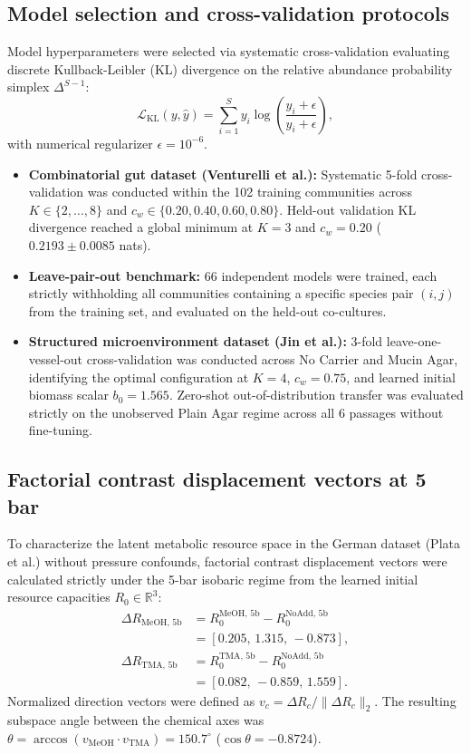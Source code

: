 \subsection*{Model selection and cross-validation protocols}
Model hyperparameters were selected via systematic cross-validation evaluating discrete Kullback-Leibler (KL) divergence on the relative abundance probability simplex $\Delta^{S-1}$:
\begin{equation}
\mathcal{L}_{\text{KL}}(y, \hat{y}) = \sum_{i=1}^S y_i \log \left( \frac{y_i + \epsilon}{\hat{y}_i + \epsilon} \right),
\end{equation}
with numerical regularizer $\epsilon = 10^{-6}$.
\begin{itemize}
    \item \textbf{Combinatorial gut dataset (Venturelli et al.):} Systematic 5-fold cross-validation was conducted within the 102 training communities across $K \in \{2, \dots, 8\}$ and $c_w \in \{0.20, 0.40, 0.60, 0.80\}$. Held-out validation KL divergence reached a global minimum at $K=3$ and $c_w = 0.20$ ($0.2193 \pm 0.0085$ nats).
    \item \textbf{Leave-pair-out benchmark:} 66 independent models were trained, each strictly withholding all communities containing a specific species pair $(i, j)$ from the training set, and evaluated on the held-out co-cultures.
    \item \textbf{Structured microenvironment dataset (Jin et al.):} 3-fold leave-one-vessel-out cross-validation was conducted across No Carrier and Mucin Agar, identifying the optimal configuration at $K=4$, $c_w = 0.75$, and learned initial biomass scalar $b_0 = 1.565$. Zero-shot out-of-distribution transfer was evaluated strictly on the unobserved Plain Agar regime across all 6 passages without fine-tuning.
\end{itemize}

\subsection*{Factorial contrast displacement vectors at 5 bar}
To characterize the latent metabolic resource space in the German dataset (Plata et al.) without pressure confounds, factorial contrast displacement vectors were calculated strictly under the 5-bar isobaric regime from the learned initial resource capacities $R_0 \in \mathbb{R}^3$:
\begin{align}
\Delta R_{\text{MeOH, 5b}} &= R_0^{\text{MeOH, 5b}} - R_0^{\text{NoAdd, 5b}} \nonumber \\
&= [0.205,\, 1.315,\, -0.873], \label{eq:methods_delta_meoh} \\
\Delta R_{\text{TMA, 5b}}  &= R_0^{\text{TMA, 5b}}  - R_0^{\text{NoAdd, 5b}} \nonumber \\
&= [0.082,\, -0.859,\, 1.559]. \label{eq:methods_delta_tma}
\end{align}
Normalized direction vectors were defined as $v_c = \Delta R_c / \|\Delta R_c\|_2$. The resulting subspace angle between the chemical axes was $\theta = \arccos(v_{\text{MeOH}} \cdot v_{\text{TMA}}) = 150.7^\circ$ ($\cos \theta = -0.8724$).

